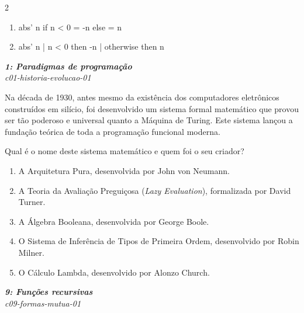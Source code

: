 \documentclass[a4paper,10pt,brazil]{article}
\begin{document}
\begin{multicols}{2}
\begin{enumerate}
  \item \begin{haskellcode}
abs' n
  if n < 0 = -n
  else     = n
\end{haskellcode}

  \item \begin{haskellcode}
abs' n
  | n < 0 then -n
  | otherwise then n
\end{haskellcode}


\end{enumerate}

\begin{flushright}
  \footnotesize
  \textit{\textbf{1: Paradigmas de programação}}\\
  \textit{c01-historia-evolucao-01}\\

\end{flushright}
Na década de 1930, antes mesmo da existência dos computadores eletrônicos construídos em silício, foi desenvolvido um sistema formal matemático que provou ser tão poderoso e universal quanto a Máquina de Turing. Este sistema lançou a fundação teórica de toda a programação funcional moderna.

Qual é o nome deste sistema matemático e quem foi o seu criador?

\begin{enumerate}
  \item A Arquitetura Pura, desenvolvida por John von Neumann.

  \item A Teoria da Avaliação Preguiçosa (\emph{Lazy Evaluation}), formalizada por David Turner.

  \item A Álgebra Booleana, desenvolvida por George Boole.

  \item O Sistema de Inferência de Tipos de Primeira Ordem, desenvolvido por Robin Milner.

  \item O Cálculo Lambda, desenvolvido por Alonzo Church.


\end{enumerate}

\begin{flushright}
  \footnotesize
  \textit{\textbf{9: Funções recursivas}}\\
  \textit{c09-formas-mutua-01}\\


\end{flushright}
\end{multicols}
\end{document}
